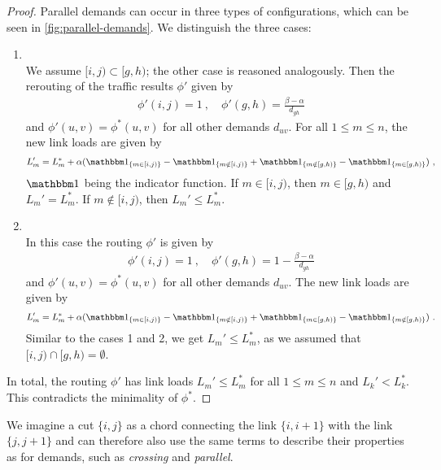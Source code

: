 \begin{proof}
	Parallel demands can occur in three types of configurations, which can be seen in \cref{fig:parallel-demands}.
	We distinguish the three cases:
	\begin{enumerate}[align=left]
		\item[\textbf{Cases 1 and 2:} $[i, j) \subset [g, h)$ or $[g, h) \subset [i,j)$]{\mbox{}\\
			We assume $[i, j) \subset [g, h)$; the other case is reasoned analogously.
			Then the rerouting of the traffic results $\phi'$ given by
			\begin{align}
				\phi'(i, j) = 1 \ ,\quad
				\phi'(g, h) = \frac{\beta - \alpha}{d_{gh}}
			\end{align}
			and $\phi'(u, v) = \phi^\ast(u, v)$ for all other demands $d_{uv}$.
			For all $1 \leq m \leq n$, the new link loads are given by
			\begin{equation}
				L_m' = L_m^\ast + \alpha (\dOne_{\{m \in [i, j)\}} - \dOne_{\{m \notin [i, j)\}} + 
				\dOne_{\{m \notin [g, h)\}} - \dOne_{\{m \in [g, h)\}}) \ ,
			\end{equation}
			$\dOne$ being the indicator function.
			If $m \in [i, j)$, then $m \in [g, h)$ and $L_m' = L_m^\ast$.
			If $m \notin [i, j)$, then  $L_m' \leq L_m^\ast$.
		}
		\item[\textbf{Case 3:} $[i, j) \cap [g, h) = \emptyset$]{\mbox{}\\
			In this case the routing $\phi'$ is given by
			\begin{align}
				\phi'(i, j) = 1 \ ,\quad
				\phi'(g, h) = 1 - \frac{\beta - \alpha}{d_{gh}}
			\end{align}
			and $\phi'(u, v) = \phi^\ast(u, v)$ for all other demands $d_{uv}$.
			The new link loads are given by
			\begin{equation}
				L_m' = L_m^\ast + \alpha (\dOne_{\{m \in [i, j)\}} - \dOne_{\{m \notin [i, j)\}} + 
				\dOne_{\{m \in [g, h)\}} - \dOne_{\{m \notin [g, h)\}}) \ .
			\end{equation}
			Similar to the cases 1 and 2, we get $L_m' \leq L_m^\ast$, as we assumed that $[i, j) \cap [g, h) = \emptyset$.
		}
	\end{enumerate}
	In total, the routing $\phi'$ has link loads $L_m' \leq L_m^\ast$ for all $1 \leq m \leq n$ and $L_k' < L_k^\ast$.
	This contradicts the minimality of $\phi^\ast$.
\end{proof}

We imagine a cut $\{i, j\}$ as a chord connecting the link $\{i, i+1\}$ with the link $\{j, j+1\}$ and can therefore also use the same terms to describe their properties as for demands, such as \emph{crossing} and \emph{parallel}.

